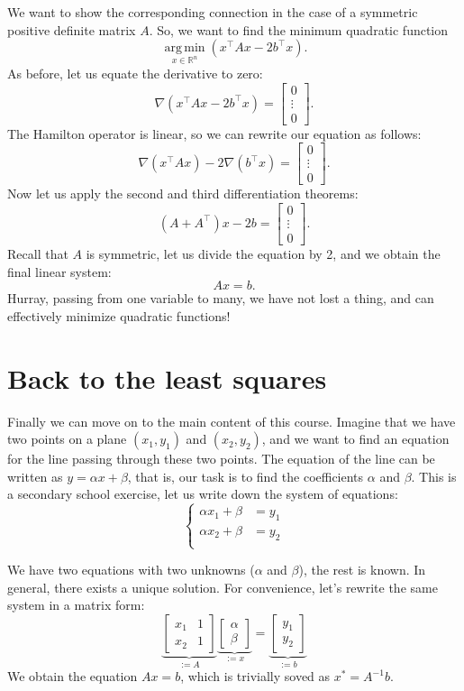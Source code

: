 \documentclass[notitlepage,oneside]{book}
\DeclareMathOperator*{\argmin}{arg\,min}
\begin{document}
We want to show the corresponding connection in the case of a symmetric positive definite matrix $A$.
So, we want to find the minimum quadratic function
$$\argmin\limits_{x\in\mathbb R^n} (x^\top A x - 2b^\top x).$$
As before, let us equate the derivative to zero:
$$\nabla (x^\top A x - 2b^\top x) = \begin{bmatrix}0 \\ \vdots \\ 0 \end{bmatrix}.$$
The Hamilton operator is linear, so we can rewrite our equation as follows:
$$\nabla (x^\top A x) - 2\nabla(b^\top x) = \begin{bmatrix}0 \\ \vdots \\ 0 \end{bmatrix}.$$
Now let us apply the second and third differentiation theorems:
$$(A+A^\top)x - 2b = \begin{bmatrix}0 \\ \vdots \\ 0 \end{bmatrix}.$$
Recall that $A$ is symmetric, let us divide the equation by 2, and we obtain the final linear system:
$$Ax = b.$$
Hurray, passing from one variable to many, we have not lost a thing, and can effectively minimize quadratic functions!


\section{Back to the least squares}
Finally we can move on to the main content of this course. Imagine that we have two points on a plane
$(x_1, y_1)$ and $(x_2, y_2)$, and we want to find an equation for the line passing through these two points.
The equation of the line can be written as $y = \alpha x + \beta$, that is, our task is to find the coefficients $\alpha$ and $\beta$.
This is a secondary school exercise, let us write down the system of equations:
$$
\left\{
\begin{split}
\alpha x_1 + \beta &= y_1\\
\alpha x_2 + \beta &= y_2\\
\end{split}
\right.
$$

We have two equations with two unknowns ($\alpha$ and $\beta$), the rest is known.
In general, there exists a unique solution. For convenience, let's rewrite the same system in a matrix form:
$$
\underbrace{\begin{bmatrix}x_1  & 1 \\ x_2 & 1 \end{bmatrix}}_{:=A} 
\underbrace{\begin{bmatrix} \alpha \\ \beta \end{bmatrix}}_{:=x} = \underbrace{\begin{bmatrix} y_1 \\ y_2 \end{bmatrix}}_{:=b}
$$
We obtain the equation $Ax = b$, which is trivially soved as $x^* = A^{-1}b$.
\end{document}
